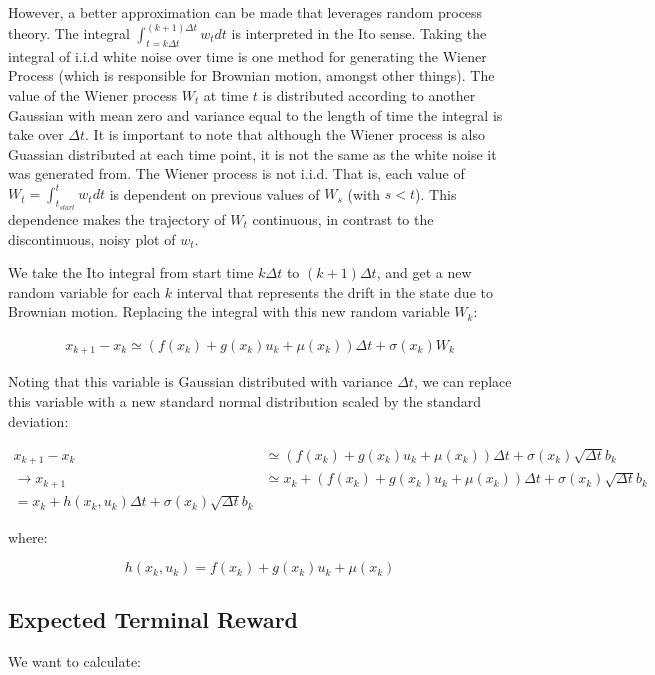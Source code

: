 \documentclass[a4paper]{article}
\begin{document}
However, a better approximation can be made that leverages random process theory.
The integral $\int_{t = k \Delta t}^{(k+1) \Delta t} w_t dt$ is interpreted in the Ito sense.
Taking the integral of i.i.d white noise over time is one method for generating the Wiener Process (which is responsible for Brownian motion, amongst other things).
The value of the Wiener process $W_t$ at time $t$ is distributed according to another Gaussian with mean zero and variance equal to the length of time the integral is take over $\Delta t$.
It is important to note that although the Wiener process is also Guassian distributed at each time point, it is not the same as the white noise it was generated from.
The Wiener process is not i.i.d.
That is, each value of $W_t = \int_{t_{start}}^{t} w_t dt$ is dependent on previous values of $W_s$ (with $s<t$).
This dependence makes the trajectory of $W_t$ continuous, in contrast to the discontinuous, noisy plot of $w_t$.

We take the Ito integral from start time $k \Delta t$ to $(k+1) \Delta t$, and get a new random variable for each $k$ interval that represents the drift in the state due to Brownian motion.
Replacing the integral with this new random variable $W_k$:

\begin{align}
x_{k+1} - x_k \simeq (f(x_k) + g(x_k) u_k + \mu(x_k)) \Delta t + \sigma(x_k) W_k
\end{align}

Noting that this variable is Gaussian distributed with variance $\Delta t$, we can replace this variable with a new standard normal distribution scaled by the standard deviation:

\begin{align}
x_{k+1} - x_k &\simeq (f(x_k) + g(x_k) u_k + \mu(x_k)) \Delta t + \sigma(x_k) \sqrt{\Delta t} b_k
\\ \rightarrow x_{k+1} &\simeq x_k + (f(x_k) + g(x_k) u_k + \mu(x_k)) \Delta t + \sigma(x_k) \sqrt{\Delta t} b_k
\label{eq:DistochDyn}
\\= x_k + h(x_k,u_k) \Delta t + \sigma(x_k) \sqrt{\Delta t} b_k
\end{align}

where:

$$
h(x_k,u_k) = f(x_k) + g(x_k) u_k + \mu(x_k)
$$

\subsection{Expected Terminal Reward}
We want to calculate:
\end{document}
